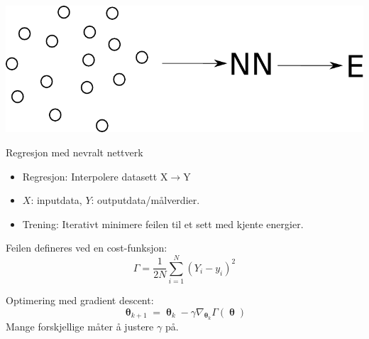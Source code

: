 \documentclass{beamer}
\begin{document}
\begin{frame}
 
\centering
\includegraphics[width=0.9\linewidth]{../Figures/Presentation/interpolation.pdf}
\begin{block}{Regresjon med nevralt nettverk}
 \begin{itemize}
  \item Regresjon: Interpolere datasett $\mathrm{X} \rightarrow \mathrm{Y}$
  \item $X$: inputdata, $Y$: outputdata/målverdier.
  \item Trening: Iterativt minimere feilen til et sett med kjente energier. 
 \end{itemize}
\end{block}

\end{frame}


\begin{frame}
 
\begin{block}{Feilen defineres ved en cost-funksjon:} 
 \begin{equation*}
 \Gamma = \frac{1}{2N}\sum_{i=1}^N (Y_i - y_i)^2
 \end{equation*}
\end{block}

\begin{block}{Optimering med gradient descent:}
 \begin{equation*}
  \boldsymbol{\uptheta}_{k+1} = \boldsymbol{\uptheta}_{k} - \gamma \nabla_{\boldsymbol{\uptheta}_k} \Gamma(\boldsymbol{\uptheta})
 \end{equation*}
 Mange forskjellige måter å justere $\gamma$ på. 
\end{block}

\end{frame}
\end{document}
